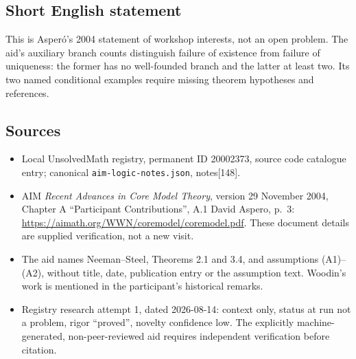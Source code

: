 \documentclass[11pt]{article}
\begin{document}
\subsection{Short English statement}
This is Asper\'o's 2004 statement of workshop interests, not an open problem. The aid's auxiliary branch counts distinguish failure of existence from failure of uniqueness: the former has no well-founded branch and the latter at least two. Its two named conditional examples require missing theorem hypotheses and references.
\subsection{Sources}
\begin{itemize}
\item Local UnsolvedMath registry, permanent ID 20002373, source code catalogue entry; canonical \texttt{aim-logic-notes.json}, notes[148].
\item AIM \emph{Recent Advances in Core Model Theory}, version 29 November 2004, Chapter A ``Participant Contributions'', A.1 David Aspero, p.~3: \url{https://aimath.org/WWN/coremodel/coremodel.pdf}. These document details are supplied verification, not a new visit.
\item The aid names Neeman--Steel, Theorems 2.1 and 3.4, and assumptions (A1)--(A2), without title, date, publication entry or the assumption text. Woodin's work is mentioned in the participant's historical remarks.
\item Registry research attempt 1, dated 2026-08-14: context only, status at run not a problem, rigor ``proved'', novelty confidence low. The explicitly machine-generated, non-peer-reviewed aid requires independent verification before citation.
\end{itemize}
\end{document}
